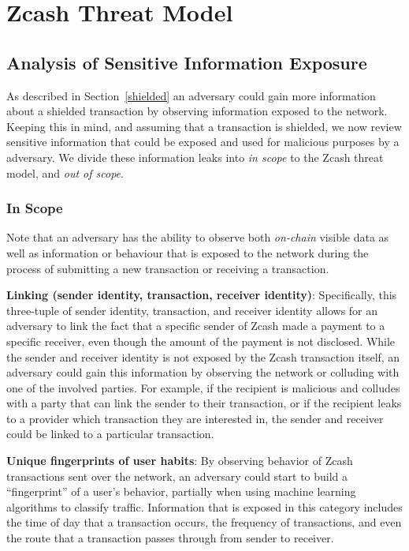 \documentclass{article}
\begin{document}
\section{Zcash Threat Model}
\label{threat-model}

\subsection{Analysis of Sensitive Information Exposure}
As described in Section~\ref{shielded} an adversary could gain more information
about a shielded transaction by observing information exposed to the network.
Keeping this in mind, and assuming that a transaction is shielded, we now
review sensitive information that could be exposed and used for malicious
purposes by a adversary.
We divide these information leaks into \emph{in scope} to the Zcash threat
model, and \emph{out of scope}.

\subsubsection{In Scope}

Note that an adversary has the ability to observe both \emph{on-chain} visible
data as well as information or behaviour that is exposed to the network during
the process of submitting a new transaction or receiving a transaction.

\textbf{Linking (sender identity, transaction, receiver identity)}:
Specifically, this three-tuple of sender identity, transaction, and receiver
identity allows for an adversary to link the fact that a
specific sender of Zcash made a payment to a specific receiver, even though the
amount of the payment is not disclosed. While the sender and receiver identity
is not exposed by the Zcash transaction itself, an adversary
could gain this information by observing the network or colluding
with one of the involved parties. For example, if the recipient is
malicious and colludes with a party that can link the sender to their
transaction, or if the recipient leaks to a provider which transaction they
are interested in, the sender and receiver could be linked to a particular
transaction.


\textbf{Unique fingerprints of user habits}: By observing behavior of Zcash
transactions sent over the network, an adversary could start to build a
“fingerprint” of a user’s behavior, partially when using machine learning
algorithms to classify traffic. Information that is exposed in this
category includes the time of day that a transaction occurs, the frequency
of transactions, and even the route that a transaction passes through from
sender to receiver.
\end{document}
